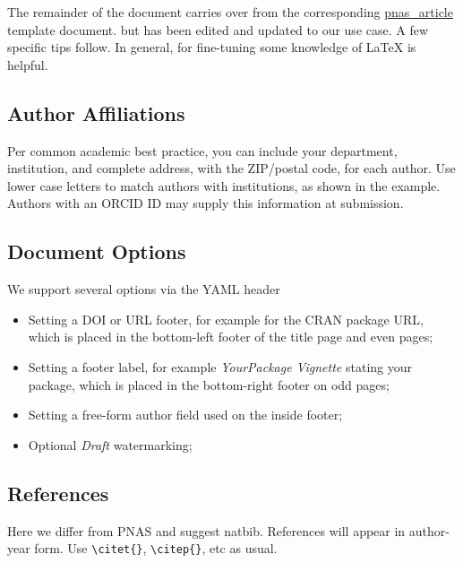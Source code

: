 \documentclass[9pt,twocolumn,twoside,printwatermark=true]{pinp}
\providecommand{\tightlist}{%
  \setlength{\itemsep}{0pt}\setlength{\parskip}{0pt}}
\begin{document}
The remainder of the document carries over from the corresponding
\href{https://github.com/rstudio/rticles/tree/master/inst/rmarkdown/templates/pnas_article}{pnas\_article}
template document. but has been edited and updated to our use case. A
few specific tips follow. In general, for fine-tuning some knowledge of
LaTeX is helpful.

\hypertarget{author-affiliations}{%
\subsection{Author Affiliations}\label{author-affiliations}}

Per common academic best practice, you can include your department,
institution, and complete address, with the ZIP/postal code, for each
author. Use lower case letters to match authors with institutions, as
shown in the example. Authors with an ORCID ID may supply this
information at submission.

\hypertarget{document-options}{%
\subsection{Document Options}\label{document-options}}

We support several options via the YAML header

\begin{itemize}
\tightlist
\item
  Setting a DOI or URL footer, for example for the CRAN package URL,
  which is placed in the bottom-left footer of the title page and even
  pages;
\item
  Setting a footer label, for example \emph{YourPackage Vignette}
  stating your package, which is placed in the bottom-right footer on
  odd pages;
\item
  Setting a free-form author field used on the inside footer;
\item
  Optional \emph{Draft} watermarking;
\end{itemize}

\hypertarget{references}{%
\subsection{References}\label{references}}

Here we differ from PNAS and suggest natbib. References will appear in
author-year form. Use \texttt{\textbackslash{}citet\{\}},
\texttt{\textbackslash{}citep\{\}}, etc as usual.
\end{document}
